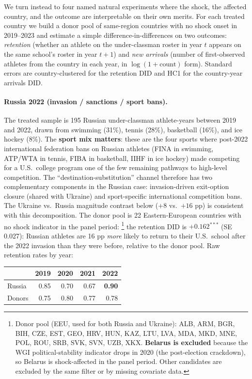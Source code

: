\documentclass[11pt]{article}
\begin{document}
We turn instead to four named natural experiments where the shock,
the affected country, and the outcome are interpretable on their
own merits. For each treated country we build a donor pool of
same-region countries with no shock onset in 2019--2023 and
estimate a simple difference-in-differences on two outcomes:
\textit{retention} (whether an athlete on the under-classman roster
in year $t$ appears on the same school's roster in year $t+1$) and
\textit{new arrivals} (number of first-observed athletes from the
country in each year, in $\log(1+\text{count})$ form). Standard
errors are country-clustered for the retention DID and HC1 for the
country-year arrivals DID.

\paragraph{Russia 2022 (invasion / sanctions / sport bans).}
The treated sample is 195 Russian under-classman athlete-years
between 2019 and 2022, drawn from swimming (31\%), tennis (28\%),
basketball (16\%), and ice hockey (8\%). The
\textbf{sport mix matters}: these are the four sports where
post-2022 international federation bans on Russian athletes
(FINA in swimming, ATP/WTA in tennis, FIBA in basketball, IIHF
in ice hockey) made competing for a U.S.\ college program one of
the few remaining pathways to high-level competition. The
``destination-substitution'' channel therefore has two
complementary components in the Russian case: invasion-driven
exit-option closure (shared with Ukraine) and sport-specific
international competition bans. The Ukraine vs.\ Russia magnitude
contrast below ($+8$ vs.\ $+16$ pp) is consistent with this
decomposition. The donor pool is 22 Eastern-European countries
with no shock indicator in the panel period:%
\footnote{Donor pool (EEU, used for both Russia and Ukraine):
ALB, ARM, BGR, BIH, CZE, EST, GEO, HRV, HUN, KAZ, LTU, LVA, MDA,
MKD, MNE, POL, ROU, SRB, SVK, SVN, UZB, XKX. \textbf{Belarus is
excluded} because the WGI political-stability indicator drops in
2020 (the post-election crackdown), so Belarus is shock-affected
in the panel period. Other candidates are excluded by the same
filter or by missing covariate data.} the retention DID is
$\mathbf{+0.162^{***}}$ (SE 0.027): Russian athletes are 16 pp
\emph{more} likely to return to their U.S.\ school after the 2022
invasion than they were before, relative to the donor pool. Raw
retention rates by year:

\begin{center}
\small
\begin{tabular}{lrrrr}
\toprule
       & 2019  & 2020  & 2021  & 2022 \\
\midrule
Russia & 0.85  & 0.70  & 0.67  & \textbf{0.90} \\
Donors & 0.75  & 0.80  & 0.77  & 0.78 \\
\bottomrule
\end{tabular}
\end{center}
\end{document}
